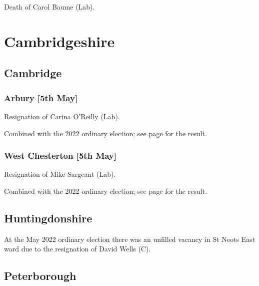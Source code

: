 \documentclass[a4paper,openany]{book}
\begin{document}
\begin{resultsiii}
Death of Carol Baume (Lab).

\section{Cambridgeshire}

\subsection*{Cambridge}

\subsubsection*{Arbury \hspace*{\fill}\nolinebreak[1]%
	\enspace\hspace*{\fill}
	[5th May]}


Resignation of Carina O'Reilly (Lab).

Combined with the 2022 ordinary election; see page \pageref{CambridgeArbury} for the result.

\subsubsection*{West Chesterton \hspace*{\fill}\nolinebreak[1]%
	\enspace\hspace*{\fill}
	[5th May]}


Resignation of Mike Sargeant (Lab).

Combined with the 2022 ordinary election; see page \pageref{CambridgeWestChesterton} for the result.

\subsection*{Huntingdonshire}

At the May 2022 ordinary election there was an unfilled vacancy in St Neots East ward due to the resignation of David Wells (C).%

\subsection*{Peterborough}


\end{resultsiii}
\end{document}
